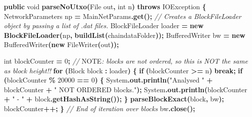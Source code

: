 \documentclass[
  italian,
  openany]{book}
\newenvironment{Shaded}{\begin{snugshade}}{\end{snugshade}}
\newcommand{\AlertTok}[1]{\textcolor[rgb]{0.94,0.16,0.16}{#1}}
\newcommand{\BuiltInTok}[1]{#1}
\newcommand{\CommentTok}[1]{\textcolor[rgb]{0.56,0.35,0.01}{\textit{#1}}}
\newcommand{\ControlFlowTok}[1]{\textcolor[rgb]{0.13,0.29,0.53}{\textbf{#1}}}
\newcommand{\DataTypeTok}[1]{\textcolor[rgb]{0.13,0.29,0.53}{#1}}
\newcommand{\DecValTok}[1]{\textcolor[rgb]{0.00,0.00,0.81}{#1}}
\newcommand{\FunctionTok}[1]{\textcolor[rgb]{0.13,0.29,0.53}{\textbf{#1}}}
\newcommand{\KeywordTok}[1]{\textcolor[rgb]{0.13,0.29,0.53}{\textbf{#1}}}
\newcommand{\NormalTok}[1]{#1}
\newcommand{\OperatorTok}[1]{\textcolor[rgb]{0.81,0.36,0.00}{\textbf{#1}}}
\newcommand{\StringTok}[1]{\textcolor[rgb]{0.31,0.60,0.02}{#1}}
\begin{document}
\begin{Shaded}
\begin{Highlighting}[]
\KeywordTok{public} \DataTypeTok{void} \FunctionTok{parseNoUtxo}\OperatorTok{(}\BuiltInTok{File}\NormalTok{ out}\OperatorTok{,} \DataTypeTok{int}\NormalTok{ n}\OperatorTok{)} \KeywordTok{throws} \BuiltInTok{IOException} \OperatorTok{\{}
\NormalTok{    NetworkParameters np }\OperatorTok{=}\NormalTok{ MainNetParams}\OperatorTok{.}\FunctionTok{get}\OperatorTok{();}
    \CommentTok{// Creates a BlockFileLoader object by passing a list of .dat files.}
\NormalTok{    BlockFileLoader loader }\OperatorTok{=} \KeywordTok{new} \FunctionTok{BlockFileLoader}\OperatorTok{(}\NormalTok{np}\OperatorTok{,} \FunctionTok{buildList}\OperatorTok{(}\NormalTok{chaindataFolder}\OperatorTok{));}
    \BuiltInTok{BufferedWriter}\NormalTok{ bw }\OperatorTok{=} \KeywordTok{new} \BuiltInTok{BufferedWriter}\OperatorTok{(}\KeywordTok{new} \BuiltInTok{FileWriter}\OperatorTok{(}\NormalTok{out}\OperatorTok{));}

    \DataTypeTok{int}\NormalTok{ blockCounter }\OperatorTok{=} \DecValTok{0}\OperatorTok{;}
    \CommentTok{// }\AlertTok{NOTE}\CommentTok{: blocks are not ordered, so this is NOT the same as block height!!}
    \ControlFlowTok{for} \OperatorTok{(}\NormalTok{Block block }\OperatorTok{:}\NormalTok{ loader}\OperatorTok{)} \OperatorTok{\{}
        \ControlFlowTok{if} \OperatorTok{(}\NormalTok{blockCounter }\OperatorTok{\textgreater{}=}\NormalTok{ n}\OperatorTok{)} \ControlFlowTok{break}\OperatorTok{;}
        \ControlFlowTok{if} \OperatorTok{(}\NormalTok{blockCounter }\OperatorTok{\%} \DecValTok{20000} \OperatorTok{==} \DecValTok{0}\OperatorTok{)} \OperatorTok{\{}
            \BuiltInTok{System}\OperatorTok{.}\FunctionTok{out}\OperatorTok{.}\FunctionTok{println}\OperatorTok{(}\StringTok{"Analysed "} \OperatorTok{+}\NormalTok{ blockCounter }\OperatorTok{+} \StringTok{" NOT ORDERED blocks."}\OperatorTok{);}
            \BuiltInTok{System}\OperatorTok{.}\FunctionTok{out}\OperatorTok{.}\FunctionTok{println}\OperatorTok{(}\NormalTok{blockCounter }\OperatorTok{+} \StringTok{" {-} "} \OperatorTok{+}\NormalTok{ block}\OperatorTok{.}\FunctionTok{getHashAsString}\OperatorTok{());}
        \OperatorTok{\}}
        \FunctionTok{parseBlockExact}\OperatorTok{(}\NormalTok{block}\OperatorTok{,}\NormalTok{ bw}\OperatorTok{);}
\NormalTok{        blockCounter}\OperatorTok{++;}
    \OperatorTok{\}} \CommentTok{// End of iteration over blocks}
\NormalTok{    bw}\OperatorTok{.}\FunctionTok{close}\OperatorTok{();}


\end{Highlighting}
\end{Shaded}
\end{document}
